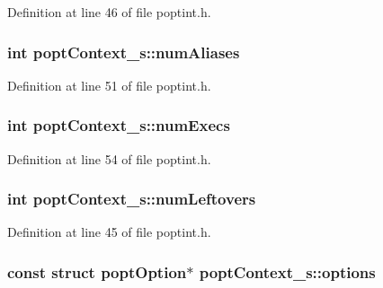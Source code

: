 Definition at line 46 of file poptint.\+h.

\hypertarget{structpopt_context__s_afb0ace2c6600299043a3ec8a922bc820}{}
\subsubsection[{num\+Aliases}]{\setlength{\rightskip}{0pt plus 5cm}int popt\+Context\+\_\+s\+::num\+Aliases}\label{structpopt_context__s_afb0ace2c6600299043a3ec8a922bc820}


Definition at line 51 of file poptint.\+h.

\hypertarget{structpopt_context__s_a57cfdc604ad6e3ff739c0d8d3a0e818a}{}
\subsubsection[{num\+Execs}]{\setlength{\rightskip}{0pt plus 5cm}int popt\+Context\+\_\+s\+::num\+Execs}\label{structpopt_context__s_a57cfdc604ad6e3ff739c0d8d3a0e818a}


Definition at line 54 of file poptint.\+h.

\hypertarget{structpopt_context__s_aa7a13994df6f103d61fed3bd5bada6e2}{}
\subsubsection[{num\+Leftovers}]{\setlength{\rightskip}{0pt plus 5cm}int popt\+Context\+\_\+s\+::num\+Leftovers}\label{structpopt_context__s_aa7a13994df6f103d61fed3bd5bada6e2}


Definition at line 45 of file poptint.\+h.

\hypertarget{structpopt_context__s_a48c8142fb4e0920ba096d95021fbd652}{}
\subsubsection[{options}]{\setlength{\rightskip}{0pt plus 5cm}const struct {\bf popt\+Option}$\ast$ popt\+Context\+\_\+s\+::options}\label{structpopt_context__s_a48c8142fb4e0920ba096d95021fbd652}


